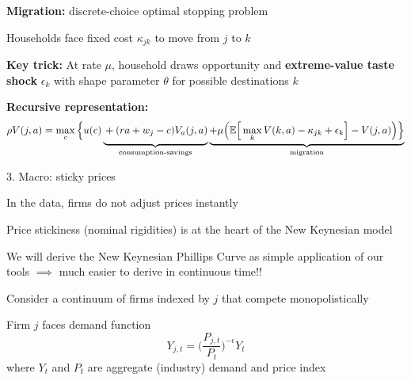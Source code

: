 \documentclass[11pt, aspectratio=169]{beamer}
\newenvironment{witemize}{\itemize\addtolength{\itemsep}{10pt}}{\enditemize}
\begin{document}
\begin{frame}{}

\textbf{Migration:} discrete-choice optimal stopping problem
\vspace{4mm}
\begin{witemize}
\item Households face fixed cost $\kappa_{jk}$ to move from $j$ to $k$

\item \textbf{Key trick:} At rate $\mu$, household draws opportunity and \textbf{extreme-value taste shock} $\epsilon_k$ with shape parameter $\theta$ for possible destinations $k$
\end{witemize}

\vspace{5mm}
\textbf{Recursive representation:}
\begin{equation*}
	\rho V(j, a) = \max_c \Big\{ u(c) 
	\underbrace{\vphantom{\max_k}
		+ (r a + w_j - c) V_a(j, a) 
	}_\text{consumption-savings}
	\underbrace{
		+ \mu \Big( \mathbb E \Big[ \max_k V(k, a) - \kappa_{jk} + \epsilon_k \Big] - V(j, a) \Big) \Big\}
	}_\text{migration}
\end{equation*}
\end{frame}


\begin{frame}{3. Macro: sticky prices} 
\begin{witemize}
\item In the data, firms do not adjust prices instantly 

\item Price stickiness (nominal rigidities) is at the heart of the New Keynesian model 

\item We will derive the New Keynesian Phillips Curve as simple application of our tools $\implies$ much easier to derive in continuous time!!

\item Consider a continuum of firms indexed by $j$ that compete monopolistically

\item Firm $j$ faces demand function 
\begin{equation*}
	Y_{j, t} = \bigg( \frac{P_{j, t}}{P_t} \bigg)^{- \epsilon} Y_t
\end{equation*}
where $Y_t$ and $P_t$ are aggregate (industry) demand and price index
\end{witemize}
\end{frame}
\end{document}
